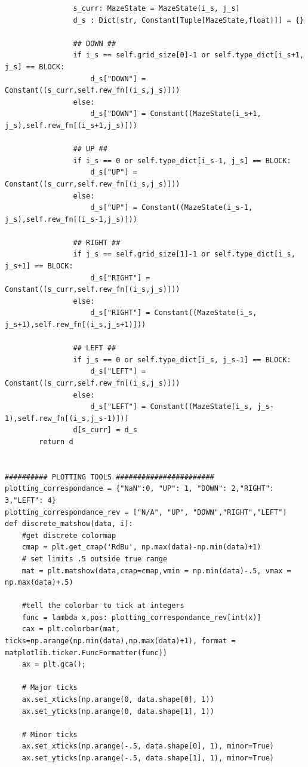 \documentclass{article}[12pt]
\begin{document}
\begin{lstlisting}
                s_curr: MazeState = MazeState(i_s, j_s)
                d_s : Dict[str, Constant[Tuple[MazeState,float]]] = {}
                
                ## DOWN ##
                if i_s == self.grid_size[0]-1 or self.type_dict[i_s+1, j_s] == BLOCK:
                    d_s["DOWN"] = Constant((s_curr,self.rew_fn[(i_s,j_s)]))
                else:
                    d_s["DOWN"] = Constant((MazeState(i_s+1, j_s),self.rew_fn[(i_s+1,j_s)]))

                ## UP ##
                if i_s == 0 or self.type_dict[i_s-1, j_s] == BLOCK:
                    d_s["UP"] = Constant((s_curr,self.rew_fn[(i_s,j_s)]))
                else:
                    d_s["UP"] = Constant((MazeState(i_s-1, j_s),self.rew_fn[(i_s-1,j_s)]))

                ## RIGHT ##
                if j_s == self.grid_size[1]-1 or self.type_dict[i_s, j_s+1] == BLOCK:
                    d_s["RIGHT"] = Constant((s_curr,self.rew_fn[(i_s,j_s)]))
                else:
                    d_s["RIGHT"] = Constant((MazeState(i_s, j_s+1),self.rew_fn[(i_s,j_s+1)]))

                ## LEFT ##
                if j_s == 0 or self.type_dict[i_s, j_s-1] == BLOCK:
                    d_s["LEFT"] = Constant((s_curr,self.rew_fn[(i_s,j_s)]))
                else:
                    d_s["LEFT"] = Constant((MazeState(i_s, j_s-1),self.rew_fn[(i_s,j_s-1)]))
                d[s_curr] = d_s
        return d


########## PLOTTING TOOLS #######################
plotting_correspondance = {"NaN":0, "UP": 1, "DOWN": 2,"RIGHT": 3,"LEFT": 4}
plotting_correspondance_rev = ["N/A", "UP", "DOWN","RIGHT","LEFT"]
def discrete_matshow(data, i):
    #get discrete colormap
    cmap = plt.get_cmap('RdBu', np.max(data)-np.min(data)+1)
    # set limits .5 outside true range
    mat = plt.matshow(data,cmap=cmap,vmin = np.min(data)-.5, vmax = np.max(data)+.5)

    #tell the colorbar to tick at integers
    func = lambda x,pos: plotting_correspondance_rev[int(x)]
    cax = plt.colorbar(mat, ticks=np.arange(np.min(data),np.max(data)+1), format = matplotlib.ticker.FuncFormatter(func))
    ax = plt.gca();

    # Major ticks
    ax.set_xticks(np.arange(0, data.shape[0], 1))
    ax.set_yticks(np.arange(0, data.shape[1], 1))

    # Minor ticks
    ax.set_xticks(np.arange(-.5, data.shape[0], 1), minor=True)
    ax.set_yticks(np.arange(-.5, data.shape[1], 1), minor=True)


\end{lstlisting}
\end{document}
